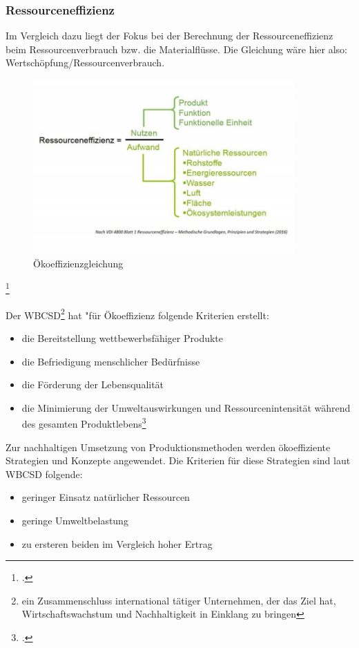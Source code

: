 \documentclass{scrartcl}
\begin{document}
\subsubsection{Ressourceneffizienz}
Im Vergleich dazu liegt der Fokus bei der Berechnung der  Ressourceneffizienz beim Ressourcenverbrauch bzw. die Materialflüsse. Die Gleichung wäre hier also: Wertschöpfung/Ressourcenverbrauch.

\begin{figure}[htbp]
\centering
\includegraphics[width=10cm]{image_folder/ressourceneffizienz.jpg}
\caption{Ökoeffizienzgleichung}
\label{fig:Ökoeffizienzgleichung}
\end{figure}\footcite{Essel2010AnalyseFazit}

   
 Der WBCSD\footnote{ein Zusammenschluss international tätiger Unternehmen, der das Ziel hat, Wirtschaftswachstum und Nachhaltigkeit in Einklang zu bringen} hat "für Ökoeffizienz folgende Kriterien erstellt: 
 
 \begin{itemize}
 \item die Bereitstellung wettbewerbsfähiger Produkte
 \item die Befriedigung menschlicher Bedürfnisse 
 \item die Förderung der Lebensqualität
 \item die Minimierung der Umweltauswirkungen und Ressourcenintensität während des gesamten Produktlebens\footcite{OkoeffizienzBrockhaus.de}
 \end{itemize}

Zur nachhaltigen Umsetzung von Produktionsmethoden werden ökoeffiziente Strategien und Konzepte angewendet. Die Kriterien für diese Strategien sind laut WBCSD folgende:
\begin{itemize}
\item geringer Einsatz natürlicher Ressourcen
\item geringe Umweltbelastung
\item zu ersteren beiden im Vergleich hoher Ertrag
\end{itemize}
\end{document}
